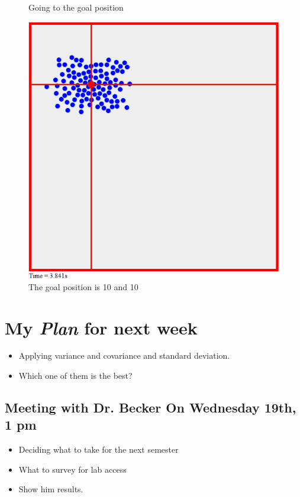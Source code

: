 \begin{itemize}
\begin{figure}[!htb]
  \caption{Going to the goal position}
\endminipage\hfill
{}%
  \includegraphics[width=\linewidth]{fig/2DControl3.png}
  \caption{The goal position is 10 and 10}
\endminipage
\end{figure}
\end{itemize}

\section{My \emph{Plan} for next week}

\begin{itemize}
\item Applying variance and covariance and standard deviation. 
\item Which one of them is the best?
\end{itemize}

\subsection{Meeting with Dr. Becker On Wednesday 19th, 1 pm }

\begin{itemize}
\item Deciding what to take for the next semester
\item What to survey for lab access
\item Show him results.
\end{itemize}


